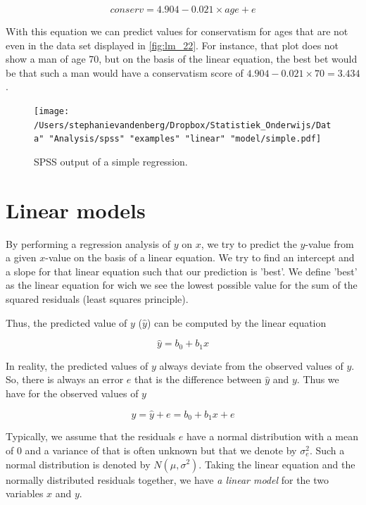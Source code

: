 \documentclass[]{book}\usepackage[]{graphicx}\usepackage[]{color}
\begin{document}
\begin{equation}
conserv = 4.904 - 0.021 \times age + e
\end{equation}

With this equation we can predict values for conservatism for ages that are not even in the data set displayed in \ref{fig:lm_22}. For instance, that plot does not show a man of age 70, but on the basis of the linear equation, the best bet would be that such a man would have a conservatism score of $4.904 - 0.021 \times 70= 3.434$.


\begin{figure}[h]
    \begin{center}
       \texttt{[image: /Users/stephanievandenberg/Dropbox/Statistiek\_Onderwijs/Data" "Analysis/spss" "examples"  "linear" "model/simple.pdf]}
    \end{center}
    \label{fig:simple}
    \caption{SPSS output of a simple regression.}
\end{figure}




\section{Linear models}

By performing a regression analysis of $y$ on $x$, we try to predict the $y$-value from a given $x$-value on the basis of a linear equation. We try to find an intercept and a slope for that linear equation such that our prediction is 'best'. We define 'best' as the linear equation for wich we see the lowest possible value for the sum of the squared residuals (least squares principle).

Thus, the predicted value of $y$ ($\hat{y}$) can be computed by the linear equation

\begin{equation}
\hat{y}= b_0 + b_1 x
\end{equation}

In reality, the predicted values of $y$ always deviate from the observed values of $y$. So, there is always an error $e$ that is the difference between $\hat{y}$ and $y$. Thus we have for the observed values of $y$

\begin{equation}
y = \hat{y} + e = b_0 + b_1 x + e
\end{equation}

Typically, we assume that the residuals $e$ have a normal distribution with a mean of 0 and a variance of that is often unknown but that we denote by $\sigma^2_e$. Such a normal distribution is denoted by $N(\mu,\sigma^2)$. Taking the linear equation and the normally distributed residuals together, we have \textit{a linear model} for the two variables $x$ and $y$.
\end{document}
